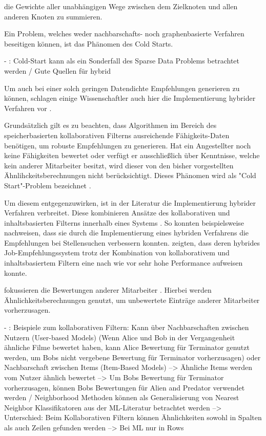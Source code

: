 die Gewichte aller unabhängigen Wege zwischen dem Zielknoten und allen anderen Knoten zu summieren.  


\newpage
Ein Problem, welches weder nachbarschafts- noch graphenbasierte Verfahren beseitigen können, ist das Phänomen des Cold Starts.

- \cite[S. 5]{huang:2004}: Cold-Start kann als ein Sonderfall des Sparse Data Problems betrachtet werden / Gute Quellen für hybrid










Um auch bei einer solch geringen Datendichte Empfehlungen generieren zu können, schlagen einige Wissenschaftler auch hier die Implementierung hybrider Verfahren vor \cite[S. 3]{weightedSimilarity:2015}.

Grundsätzlich gilt es zu beachten, dass Algorithmen im Bereich des speicherbasierten kollaborativen Filterns ausreichende Fähigkeits-Daten benötigen, um robuste Empfehlungen zu generieren. Hat ein Angestellter noch keine Fähigkeiten bewertet oder verfügt er ausschließlich über Kenntnisse, welche kein anderer Mitarbeiter besitzt, wird dieser von den bisher vorgestellten Ähnlihckeitsberechnungen nicht berücksichtigt. Dieses Phänomen wird als "Cold Start"-Problem bezeichnet \cite[S. 1]{coldStart:2002}. 

Um diesem entgegenzuwirken, ist in der Literatur die Implementierung hybrider Verfahren verbreitet. Diese kombinieren Ansätze des kollaborativen und inhaltsbasierten Filterns innerhalb eines Systems \cite[S. 8]{malinowski:2008}. So konnten beispielsweise \textcite[S. 8]{combiningCbAndCFCostSensitiveApproach:2017} nachweisen, dass sie durch die Implementierung eines hybriden Verfahrens die Empfehlungen bei Stellensuchen verbessern konnten. \textcite[S. 16]{hybridImmunizing:2017} zeigten, dass deren hybrides Job-Empfehlungssystem trotz der Kombination von kollaborativem und inhaltsbasiertem Filtern eine nach wie vor sehr hohe Performance aufweisen konnte.




\newpage

fokussieren die Bewertungen anderer Mitarbeiter \cite[S. 3]{jobMatcher:2020}. Hierbei werden Ähnlichkeitsberechnungen genutzt, um unbewertete Einträge anderer Mitarbeiter vorherzusagen. 

- \cite[S. 33]{recommenderSystems:2016}: Beispiele zum kollaborativen Filtern: Kann über Nachbarschaften zwischen Nutzern (User-based Models) (Wenn Alice und Bob in der Vergangenheit ähnliche Filme bewertet haben, kann Alice Bewertung für Terminator genutzt werden, um Bobs nicht vergebene Bewertung für Terminator vorherzusagen) oder Nachbarschaft zwischen Items (Item-Based Models) --> Ähnliche Items werden vom Nutzer ähnlich bewertet --> Um Bobs Bewertung für Terminator vorherzusagen, können Bobs Bewertungen für Alien and Predator verwendet werden / Neighborhood Methoden können als Generalisierung von Nearest Neighbor Klassifikatoren aus der ML-Literatur betrachtet werden --> Unterschied: Beim Kollaborativen Filtern können Ähnlichkeiten sowohl in Spalten als auch Zeilen gefunden werden --> Bei ML nur in Rows

